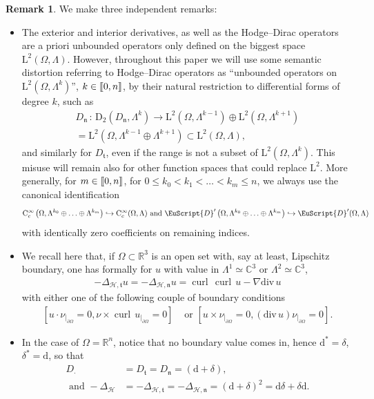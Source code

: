 \documentclass[10pt]{amsart}
\theoremstyle{definition}\newtheorem{defi}[theo]{Definition}\newtheorem{rema}[theo]{Remark}\newtheorem{exam}[theo]{Example}\newtheorem{exem}[theo]{Example}\newtheorem{nota}[theo]{Notation}
\renewcommand*{\div}{\mathrm{div\,}}
\DeclareMathOperator{\curl}{curl\,}
\newcommand{\bbR}{\mathbb{R}}
\newcommand{\bbC}{\mathbb{C}}
\newcommand{\rmd}{\mathrm{d}}
\newcommand{\rmD}{\mathrm{D}}
\newcommand{\rmL}{\mathrm{L}}
\newcommand{\rmC}{\mathrm{C}}
\newcommand{\clH}{\mathcal{H}}
\newcommand{\fkn}{\mathfrak{n}}
\newcommand{\fkt}{\mathfrak{t}}
\newcommand{\eus}{\EuScript}
\newcommand{\llbracket}{\mathopen{[\mkern -2.7mu[}}
\newcommand{\rrbracket}{\mathclose{]\mkern -2.7mu]}}
\newcommand{\llb}{\llbracket}
\newcommand{\rrb}{\rrbracket}
\begin{document}
\begin{rema}\label{rmk:HodgeLaplacianBC}
We make three independent remarks:
\begin{itemize}
\item The exterior and interior derivatives, as well as the Hodge--Dirac operators are a priori unbounded operators only defined on the biggest space $\rmL^2(\Omega,\Lambda)$. However, throughout this paper we will use some semantic distortion referring to Hodge--Dirac operators as ``unbounded operators on $\rmL^2(\Omega,\Lambda^k)$'', $k\in\llb0,n\rrb$, by their natural restriction to differential forms of degree $k$, such as
\begin{multline*}
D_\fkn \,:\, \rmD_2\left(D_\fkn,\Lambda^k\right)\longrightarrow \rmL^2\left(\Omega,\Lambda^{k-1}\right)\oplus\rmL^2\left(\Omega,\Lambda^{k+1}\right)\\
= \rmL^2\left(\Omega,\Lambda^{k-1}\oplus \Lambda^{k+1}\right)\subset \rmL^2(\Omega,\Lambda),
\end{multline*}
and similarly for $D_\fkt$, even if the range is not a subset of $\rmL^2(\Omega,\Lambda^k)$. This misuse will remain also for other function spaces that could replace $\rmL^2$. More generally, for $m\in\llb0,n\rrb$, for $0\leqslant k_0<k_1<\ldots<k_m\leqslant n$, we always use the canonical identification
\begin{align*}
\rmC _c^\infty\left(\Omega,\Lambda^{k_0} \oplus\ldots\oplus \Lambda^{k_m}\right) \hookrightarrow \rmC _c^\infty(\Omega,\Lambda) \text{ and }\eus{D}'\left(\Omega,\Lambda^{k_0} \oplus\ldots\oplus \Lambda^{k_m}\right) \hookrightarrow \eus{D}'(\Omega,\Lambda)
\end{align*}
with identically zero coefficients on remaining indices.
\item We recall here that, if $\Omega\subset \bbR^3$ is an open set with, say at least, Lipschitz boundary, one has formally for $u$ with value in $\Lambda^1\simeq \bbC^3$ or $\Lambda^2\simeq \bbC^3$,
\begin{align*}
-\Delta_{\clH,\fkt}u =-\Delta_{\clH,\fkn} u = \curl \curl u - \nabla \div u
\end{align*}
with either one of the following couple of boundary conditions
\begin{align*}
\left[u\cdot\nu_{|_{\partial\Omega}} = 0, \nu\times\curl u_{|_{\partial\Omega}} = 0\right]&\text{ or }\left[u\times\nu_{|_{\partial\Omega}} = 0, (\div u)\nu_{|_{\partial\Omega}} = 0\right] .
\end{align*}
\item In the case of $\Omega=\bbR^n$, notice that no boundary value comes in, hence $\rmd^\ast = \delta$, $\delta^\ast=\rmd$, so that
\begin{align*}
D_\cdot&=D_\fkt=D_\fkn = (\rmd+\delta),\\ \text{ and } -\Delta_{\clH}&=-\Delta_{\clH,\fkt}=-\Delta_{\clH,\fkn}= (\rmd+\delta)^2= \rmd\delta+\delta\rmd.
\end{align*}
\end{itemize}
\end{rema}
\end{document}
